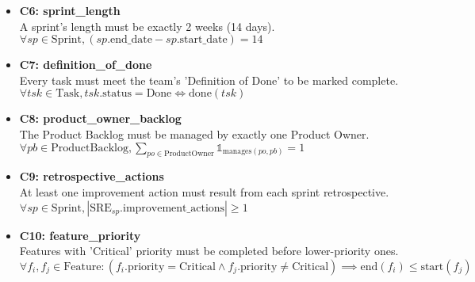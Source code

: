 \documentclass[11pt]{article}
\begin{document}
\begin{itemize}
    \item \textbf{C6: sprint\_length} \\
    A sprint's length must be exactly 2 weeks (14 days). \\
    $\forall sp \in \text{Sprint}, (sp.\text{end\_date} - sp.\text{start\_date}) = 14$

    \item \textbf{C7: definition\_of\_done} \\
    Every task must meet the team's 'Definition of Done' to be marked complete. \\
    $\forall tsk \in \text{Task}, tsk.\text{status} = \text{Done} \iff \text{done}(tsk)$

    \item \textbf{C8: product\_owner\_backlog} \\
    The Product Backlog must be managed by exactly one Product Owner. \\
    $\forall pb \in \text{ProductBacklog}, \sum_{po \in \text{ProductOwner}} \mathbb{1}_{\text{manages}(po, pb)} = 1$

    \item \textbf{C9: retrospective\_actions} \\
    At least one improvement action must result from each sprint retrospective. \\
    $\forall sp \in \text{Sprint}, |\text{SRE}_{sp}.\text{improvement\_actions}| \geq 1$

    \item \textbf{C10: feature\_priority} \\
    Features with 'Critical' priority must be completed before lower-priority ones. \\
    $\forall f_i, f_j \in \text{Feature}: (f_i.\text{priority} = \text{Critical} \land f_j.\text{priority} \neq \text{Critical}) \implies \text{end}(f_i) \leq \text{start}(f_j)$
\end{itemize}
\end{document}
